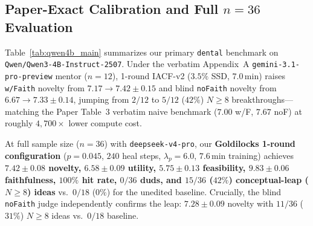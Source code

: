 \documentclass[10.5pt,letterpaper]{article}
\begin{document}
\subsection{Paper-Exact Calibration and Full \texorpdfstring{$n\!=\!36$}{n=36} Evaluation}

Table~\ref{tab:qwen4b_main} summarizes our primary \texttt{dental} benchmark on \texttt{Qwen/Qwen3-4B-Instruct-2507}. Under the verbatim Appendix~A \texttt{gemini-3.1-pro-preview} mentor ($n\!=\!12$), 1-round IACF-v2 ($3.5\%$ SSD, $7.0\,\text{min}$) raises \texttt{w/Faith} novelty from $7.17 \to 7.42 \pm 0.15$ and blind \texttt{noFaith} novelty from $6.67 \to 7.33 \pm 0.14$, jumping from $2/12$ to $5/12$ ($42\%$) $N\!\ge\!8$ breakthroughs---matching the Paper Table~3 verbatim naive benchmark ($7.00$ w/F, $7.67$ noF) at roughly $4{,}700\times$ lower compute cost.

At full sample size ($n\!=\!36$) with \texttt{deepseek-v4-pro}, our \textbf{Goldilocks 1-round configuration} ($p\!=\!0.045$, $240$ heal steps, $\lambda_p\!=\!6.0$, $7.6\,\text{min}$ training) achieves \textbf{$7.42 \pm 0.08$ novelty, $6.58 \pm 0.09$ utility, $5.75 \pm 0.13$ feasibility, $9.83 \pm 0.06$ faithfulness, $100\%$ hit rate, $0/36$ duds, and $15/36$ ($42\%$) conceptual-leap ($N\!\ge\!8$) ideas} vs.\ $0/18$ ($0\%$) for the unedited baseline. Crucially, the blind \texttt{noFaith} judge independently confirms the leap: $7.28 \pm 0.09$ novelty with $11/36$ ($31\%$) $N\!\ge\!8$ ideas vs.\ $0/18$ baseline.
\end{document}
